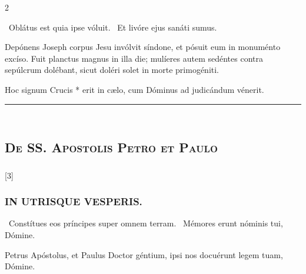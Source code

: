 \documentclass[9pt,twoside]{extarticle}
\begin{document}
\begin{multicols}{2}
{{\begin{tightlist}{}
\item {}~Oblátus est quia ipse vóluit. ~Et livóre ejus sanáti sumus.
\item {} Depónens Joseph corpus Jesu invólvit síndone, et pósuit eum in monuménto excíso. Fuit planctus magnus in illa die; mulíeres autem sedéntes contra sepúlcrum dolébant, sicut doléri solet in morte primogéniti.
\item {}
\item {} Hoc signum Crucis * erit in cælo, cum Dóminus ad judicándum vénerit.
\end{tightlist}

\begin{center}\textcolor{red}{\rule{\linewidth}{0.5pt}} \end{center}

\subsection*{\center {}}
\subsection*{\center \textsc{\\ De SS. Apostolis Petro et Paulo}}
\subsubsection*{\center {}}

\begin{tightlist}{}
\item {} [3] 
\end{tightlist}

\subsubsection*{\center \textsc{IN UTRISQUE VESPERIS.}}
\begin{tightlist}{}
\item {}~Constítues eos príncipes super omnem terram. ~Mémores erunt nóminis tui, Dómine.
\item {} Petrus Apóstolus, et Paulus Doctor géntium, ipsi nos docuérunt legem tuam, Dómine.
\end{tightlist}

}}
\end{multicols}
\end{document}

